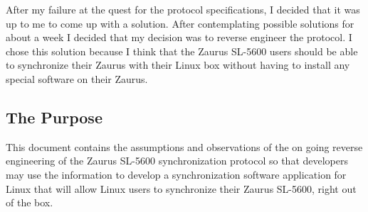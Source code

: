     After my failure at the quest for the protocol specifications, I decided
    that it was up to me to come up with a solution. After contemplating
    possible solutions for about a week I decided that my decision was to
    reverse engineer the protocol. I chose this solution because I think that
    the Zaurus SL-5600 users should be able to synchronize their Zaurus with
    their Linux box without having to install any special software on their
    Zaurus.

    \subsection{The Purpose}

    This document contains the assumptions and observations of the on going
    reverse engineering of the Zaurus SL-5600 synchronization protocol so that
    developers may use the information to develop a synchronization software
    application for Linux that will allow Linux users to synchronize their
    Zaurus SL-5600, right out of the box.
